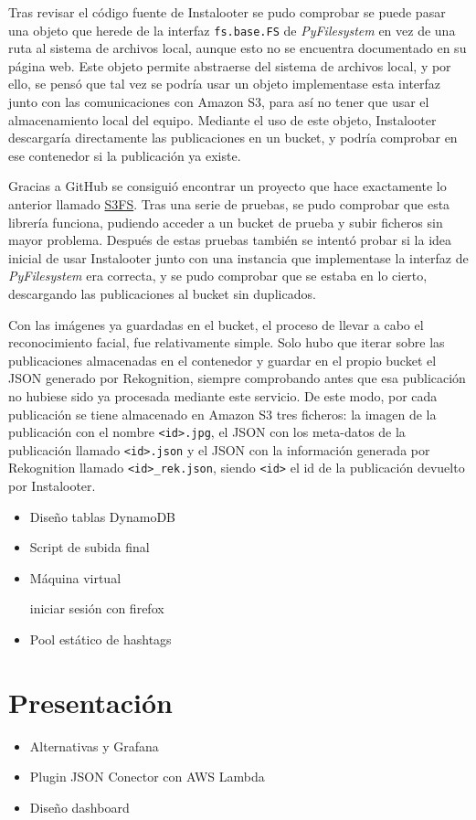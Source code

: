 Tras revisar el código fuente de Instalooter se pudo comprobar se puede pasar una objeto que herede de la interfaz \texttt{fs.base.FS} de \textit{PyFilesystem} en vez de una ruta al sistema de archivos local, aunque esto no se encuentra documentado en su página web. Este objeto permite abstraerse del sistema de archivos local, y por ello, se pensó que tal vez se podría usar un objeto implementase esta interfaz junto con las comunicaciones con Amazon S3, para así no tener que usar el almacenamiento local del equipo. Mediante el uso de este objeto, Instalooter descargaría directamente las publicaciones en un bucket, y podría comprobar en ese contenedor si la publicación ya existe.

Gracias a GitHub se consiguió encontrar un proyecto que hace exactamente lo anterior llamado \href{https://github.com/PyFilesystem/s3fs}{S3FS}. Tras una serie de pruebas, se pudo comprobar que esta librería funciona, pudiendo acceder a un bucket de prueba y subir ficheros sin mayor problema. Después de estas pruebas también se intentó probar si la idea inicial de usar Instalooter junto con una instancia que implementase la interfaz de \textit{PyFilesystem} era correcta, y se pudo comprobar que se estaba en lo cierto, descargando las publicaciones al bucket sin duplicados.

Con las imágenes ya guardadas en el bucket, el proceso de llevar a cabo el reconocimiento facial, fue relativamente simple. Solo hubo que iterar sobre las publicaciones almacenadas en el contenedor y guardar en el propio bucket el JSON generado por Rekognition, siempre comprobando antes que esa publicación no hubiese sido ya procesada mediante este servicio. De este modo, por cada publicación se tiene almacenado en Amazon S3 tres ficheros: la imagen de la publicación con el nombre \texttt{<id>.jpg}, el JSON con los meta-datos de la publicación llamado \texttt{<id>.json} y el JSON con la información generada por Rekognition llamado \texttt{<id>\_rek.json}, siendo \texttt{<id>} el id de la publicación devuelto por Instalooter.

\begin{itemize}


    \item Diseño tablas DynamoDB
    \item Script de subida final
    \item Máquina virtual
    
iniciar sesión con firefox
    
    
    
    \item Pool estático de hashtags
\end{itemize}

\section{Presentación}
\begin{itemize}
    \item Alternativas y Grafana
    \item Plugin JSON Conector con AWS Lambda
    \item Diseño dashboard
\end{itemize}

